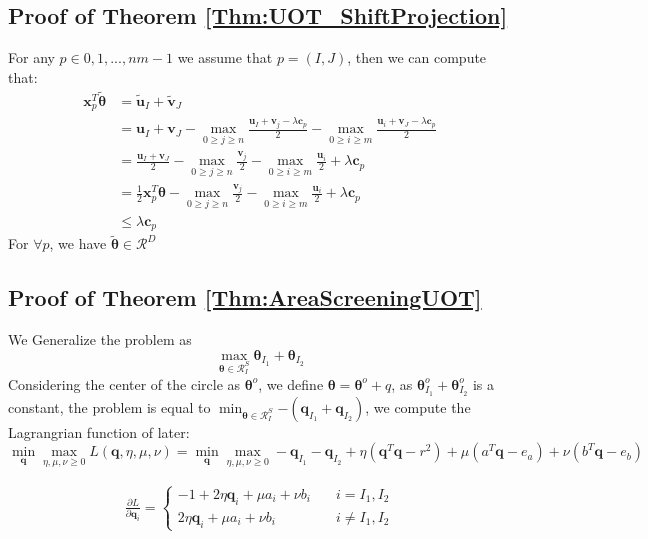 \documentclass[twoside]{article}
\theoremstyle{plain}
\renewcommand{\vec}[1]{\bm{#1}}
\begin{document}
\subsection{Proof of Theorem \ref{Thm:UOT_ShiftProjection}}
For any $p \in {0,1,...,nm -1}$ we assume that $p = (I,J)$, then we can compute that:
 \begin{equation}
\begin{split} 
\vec{x}_p^T\tilde{\vec{\theta}} &= \tilde{\vec{u}}_{I} + \tilde{\vec{v}}_J \\
				    &= {\vec{u}}_{I} + {\vec{v}}_J - \max_{0\geq j\geq n} \frac{{\vec{u}}_I +{\vec{v}}_j - \lambda \vec{c}_{p}}{2} - \max_{0 \geq i \geq m} \frac{{\vec{u}}_i +{\vec{v}}_J - \lambda \vec{c}_{p}}{2}\\
				    &= \frac{{\vec{u}}_{I} + {\vec{v}}_J}{2} - \max_{0\geq j\geq n} \frac{{\vec{v}}_j}{2} - \max_{0 \geq i \geq m} \frac{{\vec{u}}_i }{2} + \lambda \vec{c}_{p}\\
				    &= \frac{1}{2}\vec{x}_p^T{\vec{\theta}} - \max_{0\geq j\geq n} \frac{{\vec{v}}_j}{2} - \max_{0 \geq i \geq m} \frac{{\vec{u}}_i }{2} +\lambda \vec{c}_{p} \\
				    &\leq \lambda \vec{c}_{p} 
 \end{split} 
\end{equation}
For $\forall p$, we have $\tilde{\vec{\theta}} \in \mathcal{R}^{D}$

\subsection{Proof of Theorem \ref{Thm:AreaScreeningUOT}}
We Generalize the problem as 
\begin{equation}
\max_{\vec{\theta} \in \mathcal{R}^{S}_{I}}{ \vec{\theta}_{I_1} +\vec{\theta}_{I_2} }
\end{equation}
Considering the center of the circle as $\vec{\theta}^o$, we define $\vec{\theta} = \vec{\theta}^{o} + q$, as ${ \vec{\theta}^{o}_{I_1} +\vec{\theta}^{o}_{I_2} }$ is a constant, the problem is equal to $\min_{\vec{\theta} \in \mathcal{R}^{S}_{I}}{- ( \vec{q}_{I_1} +\vec{q}_{I_2} )}$, we compute the Lagrangrian function of later:
\begin{equation}
\min_{\vec{q}} \max_{\eta,\mu,\nu \geq 0} L(\vec{q},\eta,\mu,\nu) =\min_{\vec{q}}\max_{\eta,\mu,\nu\geq0} - {\vec{q}_{I_1} - \vec{q}_{I_2} + \eta( \vec{q}^T\vec{q} - r^2)+\mu( a^T\vec{q} - e_a ) + \nu( b^T\vec{q} - e_b )}
\end{equation}

 \begin{equation}
\begin{split} 
\frac{\partial L}{\partial \vec{q}_i} = \left\{
\begin{aligned}
-1 + 2\eta \vec{q}_i +\mu a_i + \nu b_i \quad& i = I_1, I_2\\
 2\eta \vec{q}_i +\mu a_i + \nu b_i \quad& i \neq I_1, I_2
\end{aligned}
\right.
 \end{split}
\label{eq:lang1}
\end{equation}
\end{document}
